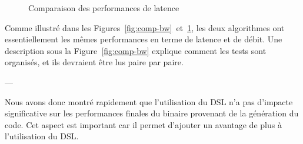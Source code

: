 \begin{figure}[h!t] \centering
    \caption{Comparaison des performances de latence}
    \label{fig:comp-lat}
\end{figure}

Comme illustré dans les Figures~\ref{fig:comp-bw}~et~\ref{fig:comp-lat}, les 
deux algorithmes ont essentiellement les mêmes performances en terme de latence 
et de débit. Une description sous la Figure~\ref{fig:comp-bw} explique comment 
les tests sont organisés, et ils devraient être lus paire par paire.

\begin{center}
---
\end{center}
    
Nous avons donc montré rapidement que l'utilisation du DSL n'a pas d'impacte 
significative sur les performances finales du binaire provenant de la 
génération du code. Cet aspect est important car il permet d'ajouter un 
avantage de plus à l'utilisation du DSL. 

